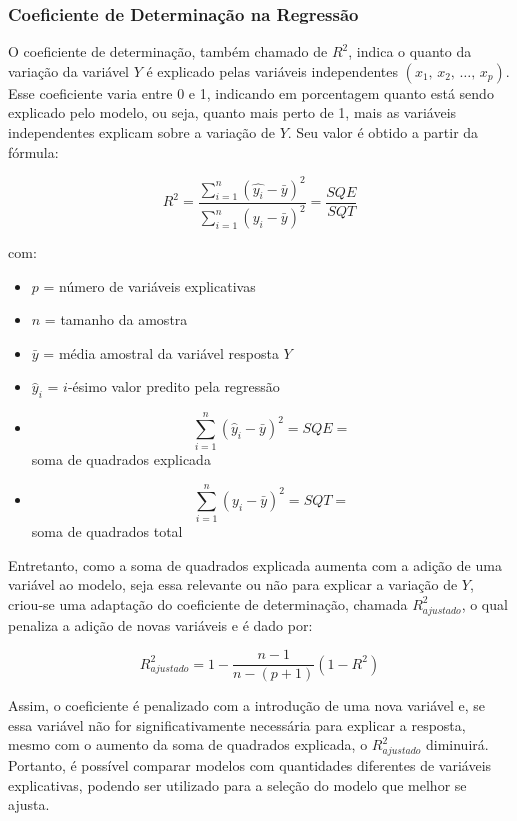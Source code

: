 \documentclass[
  portuguese,
]{estat/estat}
\begin{document}
\subsubsection{Coeficiente de Determinação na
Regressão}\label{coeficiente-de-determinauxe7uxe3o-na-regressuxe3o}

O coeficiente de determinação, também chamado de \(R^2\), indica o
quanto da variação da variável \(Y\) é explicado pelas variáveis
independentes \((x_1, \, x_2, \, \ldots, \, x_p)\). Esse coeficiente
varia entre 0 e 1, indicando em porcentagem quanto está sendo explicado
pelo modelo, ou seja, quanto mais perto de 1, mais as variáveis
independentes explicam sobre a variação de \(Y\). Seu valor é obtido a
partir da fórmula:

\[
R^2 = \frac{\displaystyle \sum^n_{i=1}\left(\hat{y_i} - \bar{y}\right)^2}{\displaystyle \sum^n_{i=1}\left(y_i - \bar{y}\right)^2} = \frac{SQE}{SQT}
\]

com:

\begin{itemize}
\item
  \(p\) = número de variáveis explicativas
\item
  \(n\) = tamanho da amostra
\item
  \(\bar{y}\) = média amostral da variável resposta \(Y\)
\item
  \(\hat{y}_i\) = \(i\)-ésimo valor predito pela regressão
\item
  \[\sum_{i=1}^{n} \left(\hat{y}_i - \bar{y}\right)^2 = SQE = \] soma de
  quadrados explicada
\item
  \[\sum_{i=1}^{n} \left(y_i - \bar{y}\right)^2 = SQT = \] soma de
  quadrados total
\end{itemize}

Entretanto, como a soma de quadrados explicada aumenta com a adição de
uma variável ao modelo, seja essa relevante ou não para explicar a
variação de \(Y\), criou-se uma adaptação do coeficiente de
determinação, chamada \(R^2_{ajustado}\), o qual penaliza a adição de
novas variáveis e é dado por:

\[
R^2_{ajustado} = 1 - \frac{n-1}{n-(p+1)} \left(1-R^2\right)
\]

Assim, o coeficiente é penalizado com a introdução de uma nova variável
e, se essa variável não for significativamente necessária para explicar
a resposta, mesmo com o aumento da soma de quadrados explicada, o
\(R^2_{ajustado}\) diminuirá. Portanto, é possível comparar modelos com
quantidades diferentes de variáveis explicativas, podendo ser utilizado
para a seleção do modelo que melhor se ajusta.
\end{document}
